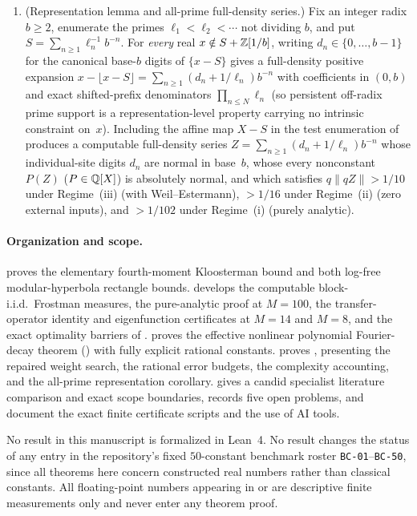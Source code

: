 \documentclass[11pt]{article}
\newcommand{\dist}[1]{\lVert #1\rVert}
\newcommand{\fr}[1]{\{#1\}}
\newcommand{\ttt}[1]{\texttt{\begingroup\def\_{\textunderscore\discretionary{}{}{}}#1\endgroup}}
\begin{document}
\begin{maintheorem}
\begin{enumerate}[label=\textup{(\roman*)},nosep]
\item {} \textup{(Representation lemma and all-prime full-density series.)} Fix an integer radix $b\ge2$, enumerate the primes $\ell_1<\ell_2<\cdots$ not dividing $b$, and put $S=\sum_{n\ge1}\ell_n^{-1}b^{-n}$. For \emph{every} real $x\notin S+\mathbb Z[1/b]$, writing $d_n\in\{0,\dots,b-1\}$ for the canonical base-$b$ digits of $\fr{x-S}$ gives a full-density positive expansion $x-\lfloor x-S\rfloor=\sum_{n\ge1}(d_n+1/\ell_n)b^{-n}$ with coefficients in $(0,b)$ and exact shifted-prefix denominators $\prod_{n\le N}\ell_n$ (so persistent off-radix prime support is a representation-level property carrying no intrinsic constraint on~$x$). Including the affine map $X-S$ in the test enumeration of  produces a computable full-density series $Z=\sum_{n\ge1}(d_n+1/\ell_n)b^{-n}$ whose individual-site digits $d_n$ are normal in base~$b$, whose every nonconstant $P(Z)$ ($P\in\mathbb Q[X]$) is absolutely normal, and which satisfies $q\dist{qZ}>1/10$ under Regime~(iii) (with Weil--Estermann), $>1/16$ under Regime~(ii) (zero external inputs), and $>1/102$ under Regime~(i) (purely analytic).
\end{enumerate}
\end{maintheorem}

\paragraph{Organization and scope.}
 proves the elementary fourth-moment Kloosterman bound and both log-free modular-hyperbola rectangle bounds.  develops the computable block-i.i.d.\ Frostman measures, the pure-analytic proof at $M=100$, the transfer-operator identity and eigenfunction certificates at $M=14$ and $M=8$, and the exact optimality barriers of .  proves the effective nonlinear polynomial Fourier-decay theorem () with fully explicit rational constants.  proves , presenting the repaired weight search, the rational error budgets, the complexity accounting, and the all-prime representation corollary.  gives a candid specialist literature comparison and exact scope boundaries,  records five open problems, and  document the exact finite certificate scripts and the use of AI tools.

No result in this manuscript is formalized in Lean~4. No result changes the status of any entry in the repository's fixed $50$-constant benchmark roster \ttt{BC-01}--\ttt{BC-50}, since all theorems here concern constructed real numbers rather than classical constants. All floating-point numbers appearing in  or  are descriptive finite measurements only and never enter any theorem proof.
\end{document}
